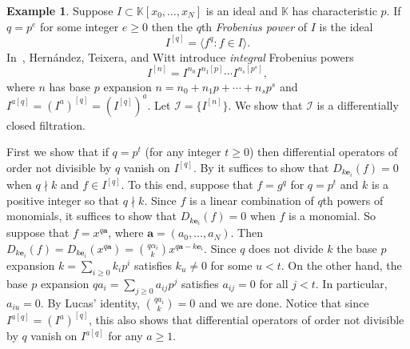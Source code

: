 \documentclass[12pt, reqno]{amsart}
\numberwithin{equation}{section}
\newcommand{\ba}{\mathbf{a}}
\newcommand{\be}{\mathbf{e}}
\newcommand{\kk}{\mathbb{K}}
\newcommand{\I}{{\mathcal I}}
\theoremstyle{plain} %
\theoremstyle{definition}
\newtheorem{ex}[thm]{Example}
\theoremstyle{remark}
\begin{document}
\begin{ex}
\label{ex:FrobeniusPowers}
Suppose $I\subset \kk[x_0,\ldots,x_N]$ is an ideal and $\kk$ has characteristic $p$.  If $q=p^e$ for some integer $e\ge 0$ then the $q$th \textit{Frobenius power} of $I$ is the ideal
\[
I^{[q]}=\langle f^{q}: f\in I\rangle.
\]
In~\cite{Hernandez-Teixera-Witt-2020}, Hern\'{a}ndez, Teixera, and Witt introduce \textit{integral} Frobenius powers
\[
I^{[n]}=I^{n_0}I^{n_1[p]}\cdots I^{n_s[p^s]},
\]
where $n$ has base $p$ expansion $n=n_0+n_1p+\cdots+n_sp^s$ and $I^{a[q]}=(I^a)^{[q]}=(I^{[q]})^a$.  Let $\I=\{I^{[n]}\}$.  We show that $\I$ is a differentially closed filtration.


First we show that if $q=p^t$ (for any integer $t\ge 0$) then differential operators of order not divisible by $q$ vanish on $I^{[q]}$.  By  it suffices to show that $D_{k\be_i}(f)=0$ when $q\nmid k$ and $f \in I^{[q]}$.
To this end, suppose that $f=g^{q}$ for $q=p^t$ and $k$ is a positive integer so that $q\nmid k$.  Since $f$ is a linear combination of $q$th powers of monomials, it suffices to show that $D_{k\be_i}(f)=0$ when $f$ is a monomial.  So suppose that $f=x^{q\ba}$, where $\ba=(a_0,\ldots,a_N)$.  Then $D_{k\be_i}(f)=D_{k\be_i}(x^{q\ba})=\binom{q\alpha_i}{k}x^{q\ba-k\be_i}$.  Since $q$ does not divide $k$ the base $p$ expansion $k=\sum_{i\ge 0}k_ip^i$ satisfies $k_u\neq 0$ for some $u<t$.  On the other hand, the base $p$ expansion $qa_i=\sum_{j\ge 0}a_{ij}p^j$ satisfies $a_{ij}=0$ for all $j<t$.  In particular, $a_{iu}=0$.  By Lucas' identity, $\binom{qa_i}{k}=0$ and we are done.  Notice that since $I^{a[q]}=(I^a)^{[q]}$, this also shows that differential operators of order not divisible by $q$ vanish on $I^{a[q]}$ for any $a\ge 1$.


\end{ex}
\end{document}
